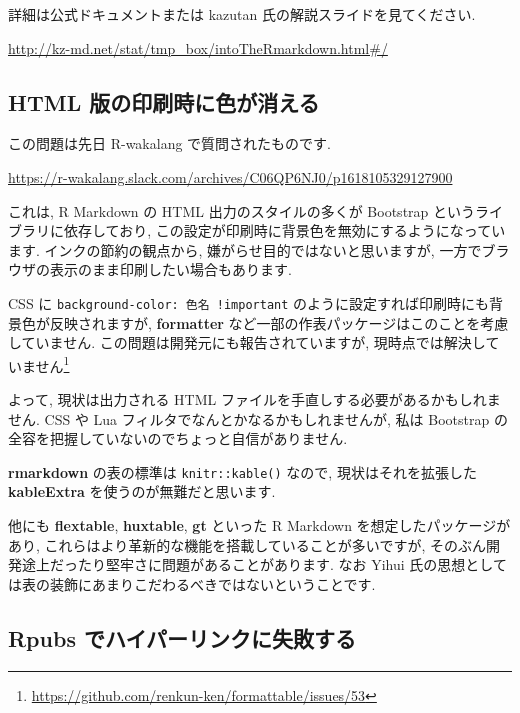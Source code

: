 \documentclass[
]{ltjsarticle}
\begin{document}
詳細は公式ドキュメントまたは kazutan 氏の解説スライドを見てください.

\url{http://kz-md.net/stat/tmp_box/intoTheRmarkdown.html\#/}

\hypertarget{html-ux7248ux306eux5370ux5237ux6642ux306bux8272ux304cux6d88ux3048ux308b}{%
\subsection{HTML 版の印刷時に色が消える}\label{html-ux7248ux306eux5370ux5237ux6642ux306bux8272ux304cux6d88ux3048ux308b}}

この問題は先日 R-wakalang で質問されたものです.

\url{https://r-wakalang.slack.com/archives/C06QP6NJ0/p1618105329127900}

これは, R Markdown の HTML 出力のスタイルの多くが Bootstrap というライブラリに依存しており, この設定が印刷時に背景色を無効にするようになっています. インクの節約の観点から, 嫌がらせ目的ではないと思いますが, 一方でブラウザの表示のまま印刷したい場合もあります.

CSS に \texttt{background-color:\ 色名\ !important} のように設定すれば印刷時にも背景色が反映されますが, \textbf{formatter} など一部の作表パッケージはこのことを考慮していません. この問題は開発元にも報告されていますが, 現時点では解決していません\footnote{\url{https://github.com/renkun-ken/formattable/issues/53}}

よって, 現状は出力される HTML ファイルを手直しする必要があるかもしれません. CSS や Lua フィルタでなんとかなるかもしれませんが, 私は Bootstrap の全容を把握していないのでちょっと自信がありません.

\textbf{rmarkdown} の表の標準は \texttt{knitr::kable()} なので, 現状はそれを拡張した \textbf{kableExtra} を使うのが無難だと思います.

他にも \textbf{flextable}, \textbf{huxtable}, \textbf{gt} といった R Markdown を想定したパッケージがあり, これらはより革新的な機能を搭載していることが多いですが, そのぶん開発途上だったり堅牢さに問題があることがあります. なお Yihui 氏の思想としては表の装飾にあまりこだわるべきではないということです.

\hypertarget{rpubs-ux3067ux30cfux30a4ux30d1ux30fcux30eaux30f3ux30afux306bux5931ux6557ux3059ux308b}{%
\subsection{Rpubs でハイパーリンクに失敗する}\label{rpubs-ux3067ux30cfux30a4ux30d1ux30fcux30eaux30f3ux30afux306bux5931ux6557ux3059ux308b}}
\end{document}
